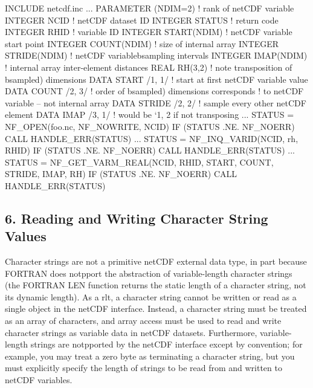 I\+N\+C\+L\+U\+DE \textquotesingle{}netcdf.\+inc\textquotesingle{} ... P\+A\+R\+A\+M\+E\+T\+ER (N\+D\+IM=2) ! rank of net\+C\+DF variable I\+N\+T\+E\+G\+ER N\+C\+ID ! net\+C\+DF dataset ID I\+N\+T\+E\+G\+ER S\+T\+A\+T\+US ! return code I\+N\+T\+E\+G\+ER R\+H\+ID ! variable ID I\+N\+T\+E\+G\+ER S\+T\+A\+R\+T(\+N\+D\+I\+M) ! net\+C\+DF variable start point I\+N\+T\+E\+G\+ER C\+O\+U\+N\+T(\+N\+D\+I\+M) ! size of internal array I\+N\+T\+E\+G\+ER S\+T\+R\+I\+D\+E(\+N\+D\+I\+M) ! net\+C\+DF variablebsampling intervals I\+N\+T\+E\+G\+ER I\+M\+A\+P(\+N\+D\+I\+M) ! internal array inter-\/element distances R\+E\+AL R\+H(3,2) ! note transposition of bsampled) dimensions D\+A\+TA S\+T\+A\+RT /1, 1/ ! start at first net\+C\+DF variable value D\+A\+TA C\+O\+U\+NT /2, 3/ ! order of bsampled) dimensions corresponds ! to net\+C\+DF variable -- not internal array D\+A\+TA S\+T\+R\+I\+DE /2, 2/ ! sample every other net\+C\+DF element D\+A\+TA I\+M\+AP /3, 1/ ! would be `1, 2\textquotesingle{} if not transposing ... S\+T\+A\+T\+US = N\+F\+\_\+\+O\+P\+EN(\textquotesingle{}foo.\+nc\textquotesingle{}, N\+F\+\_\+\+N\+O\+W\+R\+I\+TE, N\+C\+ID) IF (S\+T\+A\+T\+US .NE. N\+F\+\_\+\+N\+O\+E\+RR) C\+A\+LL H\+A\+N\+D\+L\+E\+\_\+\+E\+R\+R(\+S\+T\+A\+T\+U\+S) ... S\+T\+A\+T\+US = N\+F\+\_\+\+I\+N\+Q\+\_\+\+V\+A\+R\+ID(N\+C\+ID, \textquotesingle{}rh\textquotesingle{}, R\+H\+ID) IF (S\+T\+A\+T\+US .NE. N\+F\+\_\+\+N\+O\+E\+RR) C\+A\+LL H\+A\+N\+D\+L\+E\+\_\+\+E\+R\+R(\+S\+T\+A\+T\+U\+S) ... S\+T\+A\+T\+US = N\+F\+\_\+\+G\+E\+T\+\_\+\+V\+A\+R\+M\+\_\+\+R\+E\+A\+L(\+N\+C\+I\+D, R\+H\+I\+D, S\+T\+A\+R\+T, C\+O\+U\+N\+T, S\+T\+R\+I\+D\+E, I\+M\+A\+P, R\+H) IF (S\+T\+A\+T\+US .NE. N\+F\+\_\+\+N\+O\+E\+RR) C\+A\+LL H\+A\+N\+D\+L\+E\+\_\+\+E\+R\+R(\+S\+T\+A\+T\+U\+S)

\subsection*{6. Reading and Writing Character String Values }

Character strings are not a primitive net\+C\+DF external data type, in part because F\+O\+R\+T\+R\+AN does notpport the abstraction of variable-\/length character strings (the F\+O\+R\+T\+R\+AN L\+EN function returns the static length of a character string, not its dynamic length). As a rlt, a character string cannot be written or read as a single object in the net\+C\+DF interface. Instead, a character string must be treated as an array of characters, and array access must be used to read and write character strings as variable data in net\+C\+DF datasets. Furthermore, variable-\/length strings are notpported by the net\+C\+DF interface except by convention; for example, you may treat a zero byte as terminating a character string, but you must explicitly specify the length of strings to be read from and written to net\+C\+DF variables.


